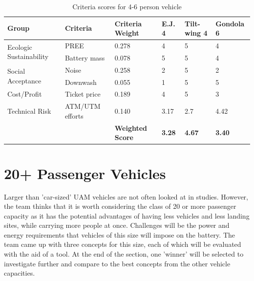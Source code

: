 \begin{table}[h]
\centering
\captionsetup{justification=centering}
\caption{Criteria scores for 4-6 person vehicle}
\label{46criteriascores}
\begin{tabular}{@{}llllll@{}}
\toprule
\textbf{Group}                           & \textbf{Criteria}  & \textbf{Criteria Weight}  & \textbf{E.J. 4} & \textbf{Tilt-wing 4} & \textbf{Gondola 6}  \\  \midrule
\multirow{2}{*}{Ecologic Sustainability} & PREE & 0.278                   & 4             & 5             & 4             \\
                                         & Battery mass       & 0.078                   & 5             & 5             & 4             \\\midrule
\multirow{2}{*}{Social Acceptance}       & Noise              & 0.258                   & 2             & 5             & 2             \\
                                         & Downwash           & 0.055                   & 1             & 5             & 5             \\\midrule
Cost/Profit                              & Ticket price       & 0.189                   & 4             & 5             & 3             \\\midrule
Technical Risk                           & ATM/UTM efforts    & 0.140                   & 3.17          & 2.7          & 4.42             \\  \midrule
\textbf{}                                & \textbf{}          & \textbf{Weighted Score} & \textbf{3.28} & \textbf{4.67} & \textbf{3.40}  \\ \bottomrule
\end{tabular}
\end{table}



\section{20+ Passenger Vehicles}
\label{sc:20}
Larger than 'car-sized' UAM vehicles are not often looked at in studies. However, the team thinks that it is worth considering the class of 20 or more passenger capacity as it has the potential advantages of having less vehicles and less landing sites, while carrying more people at once. Challenges will be the power and energy requirements that vehicles of this size will impose on the battery. The team came up with three concepts for this size, each of which will be evaluated with the aid of a tool. At the end of the section, one 'winner' will be selected to investigate further and compare to the best concepts from the other vehicle capacities. 

